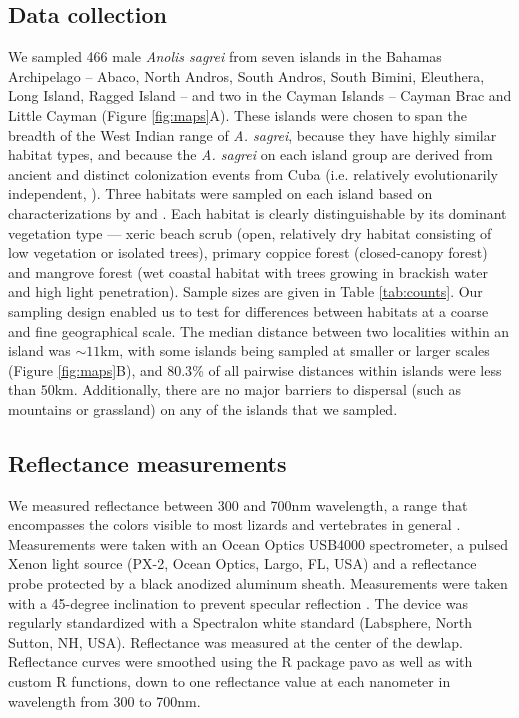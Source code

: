 
\subsection*{Data collection}

We sampled 466 male \textit{Anolis sagrei} from seven islands in the Bahamas Archipelago -- Abaco, North Andros, South Andros, South Bimini, Eleuthera, Long Island, Ragged Island -- and two in the Cayman Islands -- Cayman Brac and Little Cayman (Figure \ref{fig:maps}A). These islands were chosen to span the breadth of the West Indian range of \textit{A. sagrei}, because they have highly similar habitat types,  and because the \textit{A. sagrei} on each island group are derived from ancient and distinct colonization events from Cuba (i.e. relatively evolutionarily independent, \citealt{Reynolds2020}). Three habitats were sampled on each island based on characterizations by \citet{Howard1950} and \citet{Schoener1968}. Each habitat is clearly distinguishable by its dominant vegetation type --- xeric beach scrub (open, relatively dry habitat consisting of low vegetation or isolated trees), primary coppice forest (closed-canopy forest) and mangrove forest (wet coastal habitat with trees growing in brackish water and high light penetration). Sample sizes are given in Table \ref{tab:counts}. Our sampling design enabled us to test for differences between habitats at a coarse and fine geographical scale. The median distance between two localities within an island was $\sim 11$km, with some islands being sampled at smaller or larger scales (Figure \ref{fig:maps}B), and $80.3$\% of all pairwise distances within islands were less than $50$km. Additionally, there are no major barriers to dispersal (such as mountains or grassland) on any of the islands that we sampled.

\subsection*{Reflectance measurements}

We measured reflectance between 300 and 700nm wavelength, a range that encompasses the colors visible to most lizards and vertebrates in general \citep{Lazareva2012}. Measurements were taken with an Ocean Optics USB4000 spectrometer, a pulsed Xenon light source (PX-2, Ocean Optics, Largo, FL, USA) and a reflectance probe protected by a black anodized aluminum sheath. Measurements were taken with a 45-degree inclination to prevent specular reflection \citep{Endler1990}. The device was regularly standardized with a Spectralon white standard (Labsphere, North Sutton, NH, USA). Reflectance was measured at the center of the dewlap. Reflectance curves were smoothed using the R package pavo \citep{Maia2013} as well as with custom R functions, down to one reflectance value at each nanometer in wavelength from 300 to 700nm. 

